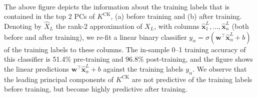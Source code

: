 \documentclass{article}
\theoremstyle{definition}
\newcommand{\CK}{\text{CK}}
\newcommand{\x}{\mathbf{x}}
\newcommand{\w}{\mathbf{w}}
\renewcommand{\a}{\alpha}
\newcommand{\1}{\mathbf{1}}
\begin{document}
%
\\

The above figure depicts the information about the training labels that is
contained in the top 2 PCs of $K^\CK$, (a) before training
and (b) after training. Denoting by $\hat{X}_L$ the rank-2 approximation of
$X_L$, with columns
$\hat{\x}_1^L,\ldots,\hat{\x}_n^L$ (both before and after training),
we re-fit a linear binary classifier $y_\a=\sigma(\w^\top \hat{\x}_\a^L+b)$
of the training labels to these columns. The in-sample 0--1 training accuracy of
this classifier is 51.4\% pre-training and 96.8\% post-training, and the 
figure shows the linear predictions $\w^\top \hat{\x}_\a^L+b$ against the
training labels $y_\a$. We observe that the leading principal components of
$K^\CK$ are not predictive of the training labels before training, but
become highly predictive after training.
\end{document}
